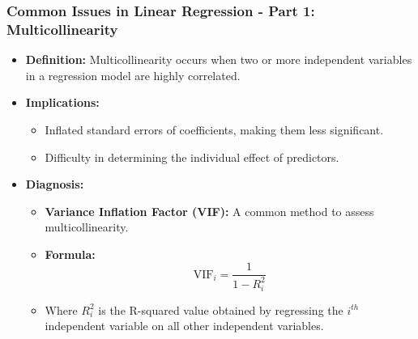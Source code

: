 \documentclass[aspectratio=169]{beamer}
\begin{document}
\begin{frame}[fragile]
    \frametitle{Common Issues in Linear Regression - Part 1: Multicollinearity}
    \begin{itemize}
        \item \textbf{Definition:} Multicollinearity occurs when two or more independent variables in a regression model are highly correlated.
        \item \textbf{Implications:}
            \begin{itemize}
                \item Inflated standard errors of coefficients, making them less significant.
                \item Difficulty in determining the individual effect of predictors.
            \end{itemize}
        \item \textbf{Diagnosis:}
            \begin{itemize}
                \item \textbf{Variance Inflation Factor (VIF):} A common method to assess multicollinearity.
                \item \textbf{Formula:} 
                \begin{equation}
                    \text{VIF}_{i} = \frac{1}{1 - R^2_i}
                \end{equation}
                \item Where \(R^2_i\) is the R-squared value obtained by regressing the \(i^{th}\) independent variable on all other independent variables.
            \end{itemize}
    \end{itemize}
\end{frame}
\end{document}

